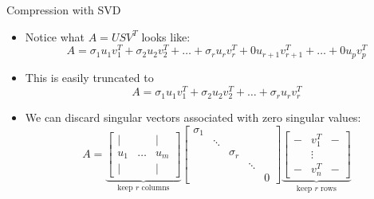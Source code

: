 \documentclass[10pt]{beamer}
\begin{document}
\begin{frame}{Compression with SVD}
\begin{itemize}
    \item Notice what $A=USV^T$ looks like:
\[
    A = \sigma_1 u_1 v_1^T + \sigma_2 u_2 v_2^T + \dots + \sigma_r u_r v_r^T +
0u_{r+1}v_{r+1}^T + \dots + 0u_{p} v_{p}^T
\]

\item This is easily truncated to
\[
    A = \sigma_1 u_1 v_1^T + \sigma_2 u_2 v_2^T + \dots + \sigma_r u_r v_r^T
\]
\item We can discard singular vectors associated with zero singular values: 
\[
A =
\underbrace{
\begin{bmatrix}
    | &  & | \\
    u_1    & \dots  & u_m \\
    | &   & |
\end{bmatrix}}_{\textrm{keep $r$ columns}}
\begin{bmatrix}
    \sigma_1 &        &          &        &\\
             & \ddots &          &        & \\
             &        & \sigma_r &        & \\
             &        &          & \ddots & \\
             &        &          &        & 0 
\end{bmatrix}
\underbrace{
\begin{bmatrix}
    - & v_1^T & -\\
     & \vdots & \\
    - & v_n^T & -
\end{bmatrix}}_{\textrm{keep $r$ rows}}
\]

\end{itemize}

\end{frame}
\end{document}
